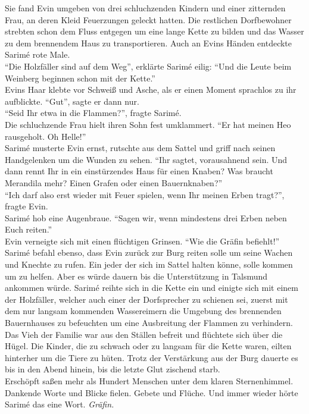 Sie fand Evin umgeben von drei schluchzenden Kindern und einer zitternden Frau, an deren Kleid 
Feuerzungen geleckt hatten. Die restlichen Dorfbewohner strebten schon dem Fluss entgegen um eine 
lange Kette zu bilden und das Wasser zu dem brennendem Haus zu transportieren. Auch an Evins Händen 
entdeckte Sarimé rote Male.\\
``Die Holzfäller sind auf dem Weg'', erklärte Sarimé eilig: ``Und die Leute beim Weinberg beginnen 
schon mit der Kette.''\\
Evins Haar klebte vor Schweiß und Asche, als er einen Moment sprachlos zu ihr aufblickte. ``Gut'', 
sagte er dann nur.\\
``Seid Ihr etwa in die Flammen?'', fragte Sarimé.\\
Die schluchzende Frau hielt ihren Sohn fest umklammert. ``Er hat meinen Heo rausgeholt. Oh 
Helle!''\\
Sarimé musterte Evin ernst, rutschte aus dem Sattel und griff nach seinen Handgelenken um die 
Wunden zu sehen. ``Ihr sagtet, vorausahnend sein. Und dann rennt Ihr in ein einstürzendes Haus für 
einen Knaben? Was braucht Merandila mehr? Einen Grafen oder einen Bauernknaben?''\\
``Ich darf also erst wieder mit Feuer spielen, wenn Ihr meinen Erben tragt?'', fragte Evin.\\
Sarimé hob eine Augenbraue. ``Sagen wir, wenn mindestens drei Erben neben Euch reiten.''\\
Evin verneigte sich mit einen flüchtigen Grinsen. ``Wie die Gräfin befiehlt!''\\
Sarimé befahl ebenso, dass Evin zurück zur Burg reiten solle um seine Wachen und Knechte zu rufen. 
Ein jeder der sich im Sattel halten könne, solle kommen um zu helfen. Aber es würde dauern bis die 
Unterstützung in Talsmund ankommen würde. Sarimé reihte sich in die Kette ein und einigte sich mit 
einem der Holzfäller, welcher auch einer der Dorfsprecher zu schienen sei, zuerst mit dem nur 
langsam kommenden Wassereimern die Umgebung des brennenden Bauernhauses zu befeuchten um eine 
Ausbreitung der Flammen zu verhindern. Das Vieh der Familie war aus den Ställen befreit und 
flüchtete sich über die Hügel. Die Kinder, die zu schwach oder zu langsam für die Kette waren, 
eilten hinterher um die Tiere zu hüten. Trotz der Verstärkung aus der Burg dauerte es bis in den 
Abend hinein, bis die letzte Glut zischend starb.\\
Erschöpft saßen mehr als Hundert Menschen unter dem klaren Sternenhimmel. Dankende Worte und Blicke 
fielen. Gebete und Flüche. Und immer wieder hörte Sarimé das eine Wort. \textit{Gräfin.}\\





